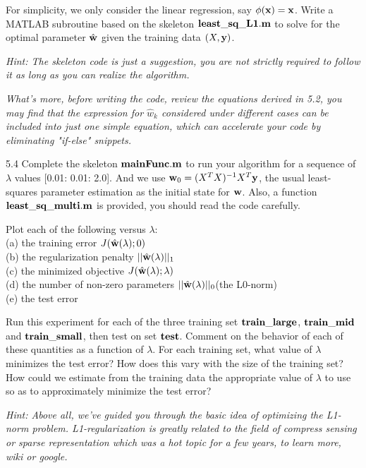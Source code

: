 \documentclass{article}
\theoremstyle{definition}
\theoremstyle{definition}
\theoremstyle{remark}
\begin{document}
For simplicity, we only consider the linear regression, say $\phi(\bold{x})=\bold{x}$. Write a MATLAB subroutine based on the skeleton $\bold{least\_sq\_L1.m}$ to solve for the optimal parameter $\hat{\bold{w}}$ given the training data $(X, \bold{y})$.

\emph{Hint: The skeleton code is just a suggestion, you are not strictly required to follow it as long as you can realize the algorithm.}

\emph{What's more, before writing the code, review the equations derived in 5.2, you may find that the expression for $\hat{w}_{k}$ considered under different cases can be included into just one simple equation, which can accelerate your code by eliminating "if-else" snippets.}

5.4 Complete the skeleton $\bold{mainFunc.m}$ to run your algorithm for a sequence of $\lambda$ values [0.01: 0.01: 2.0]. And we use $\bold{w}_{0}=(X^{T}X)^{-1}X^{T}\bold{y}$, the usual least-squares parameter estimation as the initial state for $\bold{w}$. Also, a function $\bold{least\_sq\_multi.m}$ is provided, you should read the code carefully.

Plot each of the following versus $\lambda$:\\
(a) the training error $J(\hat{\bold{w}}(\lambda);0)$\\
(b) the regularization penalty $||\hat{\bold{w}}(\lambda)||_{1}$\\
(c) the minimized objective $J(\hat{\bold{w}}(\lambda);\lambda)$\\
(d) the number of non-zero parameters $||\hat{\bold{w}}(\lambda)||_{0}$(the L0-norm)\\
(e) the test error

Run this experiment for each of the three training set $\bold{train\_large}$, $\bold{train\_mid}$ and $\bold{train\_small}$, then test on set $\bold{test}$. Comment on the behavior of each of these quantities as a function of $\lambda$. For each training set, what value of $\lambda$ minimizes the test error? How does this vary with the size of the training set? How could we estimate from the training data the appropriate value of $\lambda$ to use so as to approximately minimize the test error?

\emph{Hint: Above all, we've guided you through the basic idea of optimizing the L1-norm problem. L1-regularization is greatly related to the field of compress sensing or sparse representation which was a hot topic for a few years, to learn more, wiki or google.}
\end{document}
